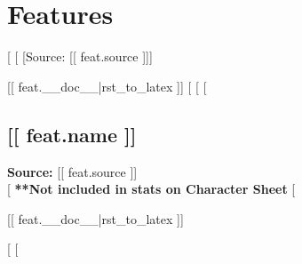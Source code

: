 \section*{Features}
[%
  [%
    [Source: [[ feat.source ]]]

    [[ feat.__doc__|rst_to_latex ]]
  [%
[%
  [%
    \subsection*{[[ feat.name ]]}

    \noindent
    \textbf{Source:} [[ feat.source ]] \\

    [%
      \textbf{**Not included in stats on Character Sheet} %
    [%
              
    [[ feat.__doc__|rst_to_latex ]]

  [%
[%
